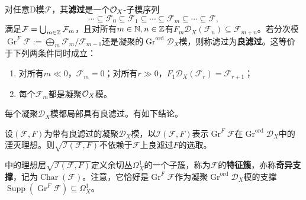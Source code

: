 对任意D模$\mathcal F$，其\textbf{滤过}是一个$\mathcal O_X$-子模序列
\[\cdots\subseteq\mathcal F_0\subseteq\mathcal F_1\subseteq\cdots\subseteq\mathcal F_m\subseteq\cdots\subseteq\mathcal F,\]
满足$\mathcal F=\bigcup_{m\in\mathbb{Z}}\mathcal F_m$，且对所有$m\in\mathbb{N},n\in\mathbb{Z}$有$F_m\mathcal D_X(\mathcal F_n)\subseteq\mathcal F_{m+n}$。若分次模$\operatorname{Gr}^F\mathcal F:=\bigoplus_m\mathcal F_m/\mathcal F_{m-1}$还是凝聚的$\operatorname{Gr}^{\mathrm{ord}}\mathcal D_X$模，则称滤过为\textbf{良滤过}。这等价于下列两条件同时成立：
\begin{enumerate}[label=\arabic*.]
\item 对所有$m\ll0$，$\mathcal F_m=0$；对所有$r\gg0$，$F_1\mathcal D_X(\mathcal F_r)=\mathcal F_{r+1}$；
\item 每个$\mathcal F_m$都是凝聚$\mathcal O_X$模。
\end{enumerate}
每个凝聚$\mathcal D_X$模都局部具有良滤过。有如下结论。
\begin{proposition}\label{L14S2O4}
设$(\mathcal F,F)$为带有良滤过的凝聚$\mathcal D_X$模，以$\mathcal I(\mathcal F,F)$表示$\operatorname{Gr}^F\mathcal F$在$\operatorname{Gr}^{\mathrm{ord}}\mathcal D_X$中的湮灭理想。则$\sqrt{\mathcal I(\mathcal F,F)}$不依赖于$\mathcal F$上良滤过$F$的选取。
\end{proposition}
中的理想层$\sqrt{\mathcal I(\mathcal F,F)}$定义余切丛$\Omega_X^1$的一个子簇，称为$\mathcal F$的\textbf{特征簇}，亦称\textbf{奇异支撑}，记为$\operatorname{Char}(\mathcal F)$。注意，它恰好是$\operatorname{Gr}^F\mathcal F$作为凝聚$\operatorname{Gr}^{\mathrm{ord}}\mathcal D_X$模的支撑$\operatorname{Supp}(\operatorname{Gr}^F\mathcal F)\subseteq\Omega_X^1$。

